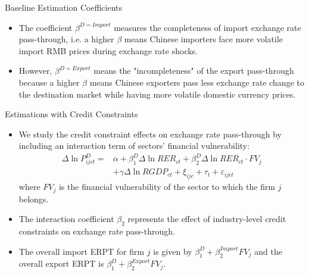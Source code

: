 \documentclass[10pt]{beamer}
\begin{document}
\begin{frame}{Baseline Estimation Coefficients}
	\begin{itemize}
		\item The coefficient $\beta^{D=Import}$ measures the completeness of import exchange rate pass-through, i.e. a higher $\beta$ means Chinese importers face more volatile import RMB prices during exchange rate shocks.
		\item However,  $\beta^{D=Export}$ means the "incompleteness" of the export pass-through because a higher $\beta$ means Chinese exporters pass less exchange rate change to the destination market while having more volatile domestic currency prices.
	\end{itemize}
\end{frame}

\begin{frame}{Estimations with Credit Constraints}
	\begin{itemize}
		\item We study the credit constraint effects on exchange rate pass-through by including an interaction term of sectors’ financial vulnerability:
		\begin{equation}
			\begin{aligned}
				\Delta \ln P^{D}_{ijct}=&\alpha+\beta^D_{1} \Delta \ln RER_{ct}+\beta^D_{2} \Delta \ln RER_{ct} \cdot FV_{j} \\ &+\gamma \Delta \ln RGDP_{ct}+\xi_{ijc}+\tau_{t} +\varepsilon_{ijct}
			\end{aligned}
			\label{eq4.2}
		\end{equation}
		{\footnotesize where $FV_{j}$ is the financial vulnerability of the sector to which the firm $j$ belongs.}
		\item The interaction coefficient $\beta_2$ represents the effect of industry-level credit constraints on exchange rate pass-through.
		\item The overall import ERPT for firm $j$ is given by $\beta^D_{1} +\beta^{Import}_{2} FV_j$ and the overall export ERPT is $\beta^D_{1} +\beta^{Export}_{2} FV_j$.
	\end{itemize}
\end{frame}
\end{document}
